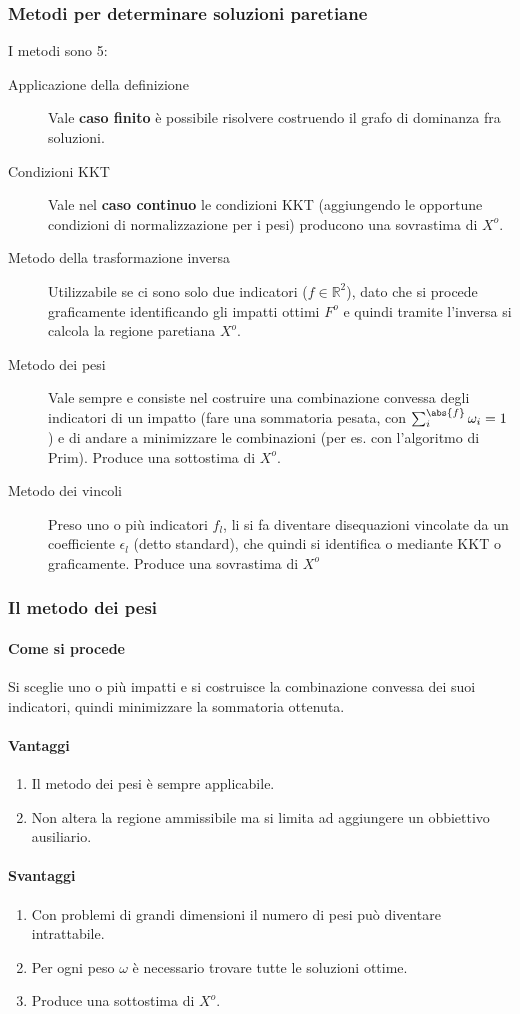 \documentclass[\main/main.tex]{subfiles}
\begin{document}
\subsubsection*{Metodi per determinare soluzioni paretiane}
I metodi sono 5:
\begin{description}
  \item[Applicazione della definizione] Vale \textbf{caso finito} è possibile risolvere costruendo il grafo di dominanza fra soluzioni.
  \item[Condizioni KKT] Vale nel \textbf{caso continuo} le condizioni KKT (aggiungendo le opportune condizioni di normalizzazione per i pesi) producono una sovrastima di $X^o$.
  \item[Metodo della trasformazione inversa] Utilizzabile se ci sono solo due indicatori ($f \in \mathbb{R}^2 $), dato che si procede graficamente identificando gli impatti ottimi $F^o$ e quindi tramite l'inversa si calcola la regione paretiana $X^o$.
  \item[Metodo dei pesi] Vale sempre e consiste nel costruire una combinazione convessa degli indicatori di un impatto (fare una sommatoria pesata, con $\sum_i^{\abs{f}} \omega_i = 1$) e di andare a minimizzare le combinazioni (per es. con l'algoritmo di Prim). Produce una sottostima di $X^o$.
  \item[Metodo dei vincoli] Preso uno o più indicatori $f_l$, li si fa diventare disequazioni vincolate da un coefficiente $\epsilon_l$ (detto standard), che quindi si identifica o mediante KKT o graficamente. Produce una sovrastima di $X^o$
\end{description}

\subsubsection*{Il metodo dei pesi}
\paragraph*{Come si procede}
Si sceglie uno o più impatti e si costruisce la combinazione convessa dei suoi indicatori, quindi minimizzare la sommatoria ottenuta.

\paragraph*{Vantaggi}
\begin{enumerate}
  \item Il metodo dei pesi è sempre applicabile.
  \item Non altera la regione ammissibile ma si limita ad aggiungere un obbiettivo ausiliario.
\end{enumerate}

\paragraph*{Svantaggi}
\begin{enumerate}
  \item Con problemi di grandi dimensioni il numero di pesi può diventare intrattabile.
  \item Per ogni peso $\omega$ è necessario trovare tutte le soluzioni ottime.
  \item Produce una sottostima di $X^o$.
\end{enumerate}
\end{document}
